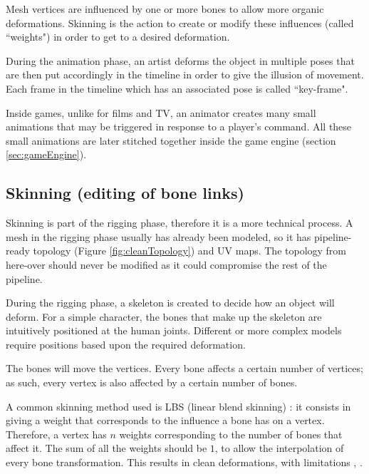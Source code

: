 \documentclass[12pt,twoside]{report}
\begin{document}
Mesh vertices are influenced by one or more bones to allow more organic deformations. Skinning is the action to create or modify these influences (called ``weights") in order to get to a desired deformation.

During the animation phase, an artist deforms the object in multiple poses that are then put accordingly in the timeline in order to give the illusion of movement. Each frame in the timeline which has an associated pose is called ``key-frame".

Inside games, unlike for films and TV, an animator creates many small animations that may be triggered in response to a player's command. All these small animations are later stitched together inside the game engine (section \ref{sec:gameEngine}).

\subsection{Skinning (editing of bone links)}
\label{subsec:skinning}
Skinning is part of the rigging phase, therefore it is a more technical process. A mesh in the rigging phase usually has already been modeled, so it has pipeline-ready topology (Figure \ref{fig:cleanTopology}) and UV maps. The topology from here-over should never be modified as it could compromise the rest of the pipeline.

During the rigging phase, a skeleton is created to decide how an object will deform. For a simple character, the bones that make up the skeleton are intuitively positioned at the human joints. Different or more complex models require positions based upon the required deformation.

The bones will move the vertices. Every bone affects a certain number of vertices; as such, every vertex is also affected by a certain number of bones.

A common skinning method used is LBS (linear blend skinning) \cite{tarini2014accurate}: it consists in giving a weight that corresponds to the influence a bone has on a vertex. Therefore, a vertex has $n$ weights corresponding to the number of bones that affect it. The sum of all the weights should be $1$, to allow the interpolation of every bone transformation. This results in clean deformations, with limitations \cite{lewis2000pose}, \cite{li2011automatic}.
\end{document}
